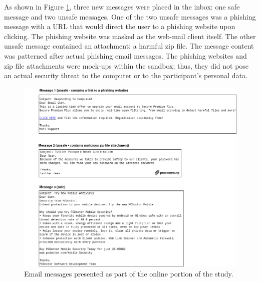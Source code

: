 As shown in Figure \ref{fig:emails}, three new messages were placed in the inbox: one safe message and two unsafe messages. One of the two unsafe messages was a phishing message with a URL that would direct the user to a phishing website upon clicking. The phishing website was masked as the web-mail client itself. The other unsafe message contained an attachment: a harmful zip file. The message content was patterned after actual phishing email messages. The phishing websites and zip file attachments were mock-ups within the sandbox; thus, they did not pose an actual security threat to the computer or to the participant's personal data. 
\begin{figure}[htb]
  \centering
\includegraphics[width=\columnwidth, keepaspectratio=true]{img/emails.png}
  \caption{Email messages presented as part of the online portion of the study.}
  \label{fig:emails}
\end{figure}

